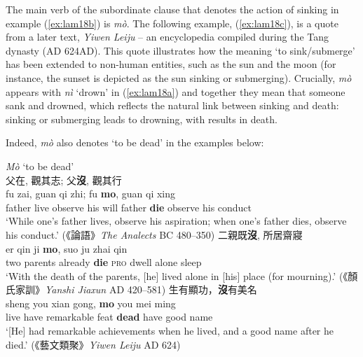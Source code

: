 \documentclass[output=paper]{langscibook}
\begin{document}
The main verb of the subordinate clause that denotes the action of sinking in example (\ref{ex:lam18b}) is \textit{mò}. The following example, (\ref{ex:lam18c}), is a quote from a later text, \emph{Yiwen Leiju} – an encyclopedia compiled during the Tang dynasty (AD 624AD). This quote illustrates how the meaning `to sink/submerge' has been extended to non-human entities, such as the sun and the moon (for instance, the sunset is depicted as the sun sinking or submerging). Crucially, \textit{mò} appears with \textit{nì} `drown' in (\ref{ex:lam18a}) and together they mean that someone sank and drowned, which reflects the natural link between sinking and death: sinking or submerging leads to drowning, with results in death. 

Indeed, \textit{mò} also denotes `to be dead' in the examples below: 

\ea \textit{Mò} `to be dead'  \label{ex:lam19}\\
  \ea 父在, 觀其志; 父\textbf{沒}, 觀其行 \label{ex:lam19a}\\
  	\gll fu zai, guan qi zhi; fu \textbf{mo}, guan qi xing\\
  	father live observe	his	will father	\textbf{die} observe his	conduct\\
  	\glt `While one's father lives, observe his aspiration; when one's father dies, observe his conduct.' (《論語》\emph{The Analects} BC 480–350)  
  \ex 二親既\textbf{沒}, 所居齋寢 \label{ex:lam19b}\\
  	\gll er	qin	ji \textbf{mo}, suo ju zhai qin\\
  	two	parents	already	\textbf{die} \textsc{pro} dwell alone	sleep\\
  	\glt `With the death of the parents, [he] lived alone in [his] place (for mourning).' (《顏氏家訓》\emph{Yanshi Jiaxun} AD 420–581) 
  \ex 生有顯功，\textbf{沒}有美名 \label{ex:lam19c}\\
	\gll sheng you xian gong, \textbf{mo} you mei ming\\ 
	live have remarkable feat \textbf{dead} have	good name\\
	\glt `[He] had remarkable achievements when he lived, and a good name after he died.' (《藝文類聚》\emph{Yiwen Leiju} AD 624)
\z \z
\end{document}
